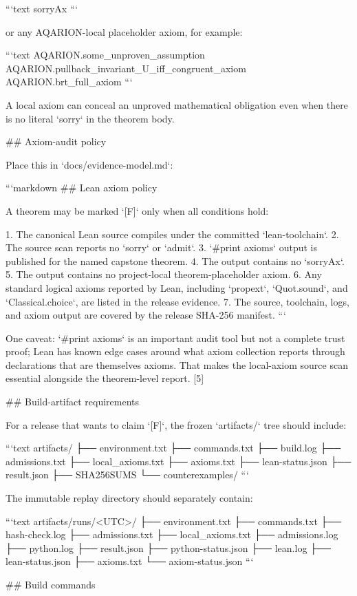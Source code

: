 ```text
sorryAx
```

or any AQARION-local placeholder axiom, for example:

```text
AQARION.some_unproven_assumption
AQARION.pullback_invariant_U_iff_congruent_axiom
AQARION.brt_full_axiom
```

A local axiom can conceal an unproved mathematical obligation even when there is no literal `sorry` in the theorem body.

## Axiom-audit policy

Place this in `docs/evidence-model.md`:

```markdown
## Lean axiom policy

A theorem may be marked `[F]` only when all conditions hold:

1. The canonical Lean source compiles under the committed `lean-toolchain`.
2. The source scan reports no `sorry` or `admit`.
3. `#print axioms` output is published for the named capstone theorem.
4. The output contains no `sorryAx`.
5. The output contains no project-local theorem-placeholder axiom.
6. Any standard logical axioms reported by Lean, including `propext`,
   `Quot.sound`, and `Classical.choice`, are listed in the release evidence.
7. The source, toolchain, logs, and axiom output are covered by the release
   SHA-256 manifest.
```

One caveat: `#print axioms` is an important audit tool but not a complete trust proof; Lean has known edge cases around what axiom collection reports through declarations that are themselves axioms. That makes the local-axiom source scan essential alongside the theorem-level report. [5]

## Build-artifact requirements

For a release that wants to claim `[F]`, the frozen `artifacts/` tree should include:

```text
artifacts/
├── environment.txt
├── commands.txt
├── build.log
├── admissions.txt
├── local_axioms.txt
├── axioms.txt
├── lean-status.json
├── result.json
├── SHA256SUMS
└── counterexamples/
```

The immutable replay directory should separately contain:

```text
artifacts/runs/<UTC>/
├── environment.txt
├── commands.txt
├── hash-check.log
├── admissions.txt
├── local_axioms.txt
├── admissions.log
├── python.log
├── result.json
├── python-status.json
├── lean.log
├── lean-status.json
├── axioms.txt
└── axiom-status.json
```

## Build commands

